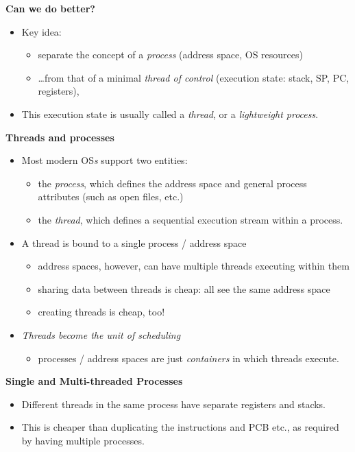 \documentclass[11pt,a4paper]{article}
\begin{document}
\textbf{Can we do better?}
\begin{itemize}
    \item Key idea:
        \begin{itemize}
            \item separate the concept of a \emph{process} (address space, OS resources)
            \item \dots from that of a minimal \emph{thread of control}
                (execution state: stack, SP, PC, registers),
        \end{itemize}
    \item This execution state is usually called a \emph{thread}, or a
        \emph{lightweight process}.
\end{itemize}

\textbf{Threads and processes}
\begin{itemize}
    \item Most modern OS\emph{s} support two entities:
        \begin{itemize}
            \item the \emph{process}, which defines the address space and general process
                attributes (such as open files, etc.)
            \item the \emph{thread}, which defines a sequential execution stream within a
                process.
        \end{itemize}
    \item A thread is bound to a single process / address space
        \begin{itemize}
            \item address spaces, however, can have multiple threads executing within them
            \item sharing data between threads is cheap: all see the same address space
            \item creating threads is cheap, too!
        \end{itemize}
    \item \emph{Threads become the unit of scheduling}
        \begin{itemize}
            \item processes / address spaces are just \emph{containers} in which threads
                execute.
        \end{itemize}
\end{itemize}

\textbf{Single and Multi-threaded Processes}
\begin{itemize}
    \item Different threads in the same process have separate registers and stacks.
    \item This is cheaper than duplicating the instructions and PCB etc.,
        as required by having multiple processes.
\end{itemize}
\end{document}
